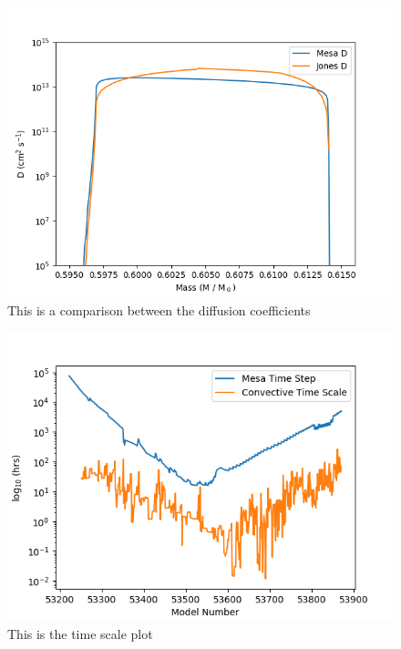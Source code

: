 \documentclass[fleqn,usenatbib]{mnras}
\begin{document}
\begin{figure}
  \includegraphics[width=\columnwidth]{figs/Diffusion_compare.png}
  \caption{This is a comparison between the diffusion coefficients} 
\end{figure}

\begin{figure}
  \includegraphics[width=\columnwidth]{figs/Time_scale.png}
  \caption{This is the time scale plot} 
\end{figure}
\end{document}
